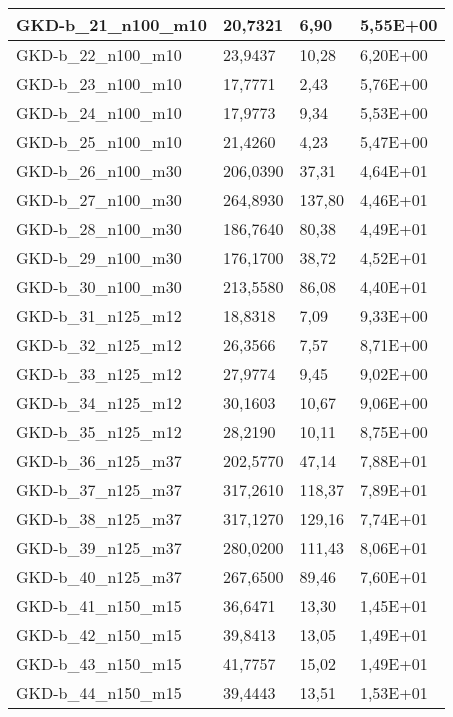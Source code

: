 \begin{table}[!ht]
\begin{adjustbox}{height=12cm}
\begin{tabular}{|l|l|l|l|}
		GKD-b\_21\_n100\_m10 & 20,7321  & 6,90           & 5,55E+00 \\ \hline
		GKD-b\_22\_n100\_m10 & 23,9437  & 10,28          & 6,20E+00 \\ \hline
		GKD-b\_23\_n100\_m10 & 17,7771  & 2,43           & 5,76E+00 \\ \hline
		GKD-b\_24\_n100\_m10 & 17,9773  & 9,34           & 5,53E+00 \\ \hline
		GKD-b\_25\_n100\_m10 & 21,4260  & 4,23           & 5,47E+00 \\ \hline
		GKD-b\_26\_n100\_m30 & 206,0390 & 37,31          & 4,64E+01 \\ \hline
		GKD-b\_27\_n100\_m30 & 264,8930 & 137,80         & 4,46E+01 \\ \hline
		GKD-b\_28\_n100\_m30 & 186,7640 & 80,38          & 4,49E+01 \\ \hline
		GKD-b\_29\_n100\_m30 & 176,1700 & 38,72          & 4,52E+01 \\ \hline
		GKD-b\_30\_n100\_m30 & 213,5580 & 86,08          & 4,40E+01 \\ \hline
		GKD-b\_31\_n125\_m12 & 18,8318  & 7,09           & 9,33E+00 \\ \hline
		GKD-b\_32\_n125\_m12 & 26,3566  & 7,57           & 8,71E+00 \\ \hline
		GKD-b\_33\_n125\_m12 & 27,9774  & 9,45           & 9,02E+00 \\ \hline
		GKD-b\_34\_n125\_m12 & 30,1603  & 10,67          & 9,06E+00 \\ \hline
		GKD-b\_35\_n125\_m12 & 28,2190  & 10,11          & 8,75E+00 \\ \hline
		GKD-b\_36\_n125\_m37 & 202,5770 & 47,14          & 7,88E+01 \\ \hline
		GKD-b\_37\_n125\_m37 & 317,2610 & 118,37         & 7,89E+01 \\ \hline
		GKD-b\_38\_n125\_m37 & 317,1270 & 129,16         & 7,74E+01 \\ \hline
		GKD-b\_39\_n125\_m37 & 280,0200 & 111,43         & 8,06E+01 \\ \hline
		GKD-b\_40\_n125\_m37 & 267,6500 & 89,46          & 7,60E+01 \\ \hline
		GKD-b\_41\_n150\_m15 & 36,6471  & 13,30          & 1,45E+01 \\ \hline
		GKD-b\_42\_n150\_m15 & 39,8413  & 13,05          & 1,49E+01 \\ \hline
		GKD-b\_43\_n150\_m15 & 41,7757  & 15,02          & 1,49E+01 \\ \hline
		GKD-b\_44\_n150\_m15 & 39,4443  & 13,51          & 1,53E+01 \\ \hline

\end{tabular}
\end{adjustbox}
\end{table}
